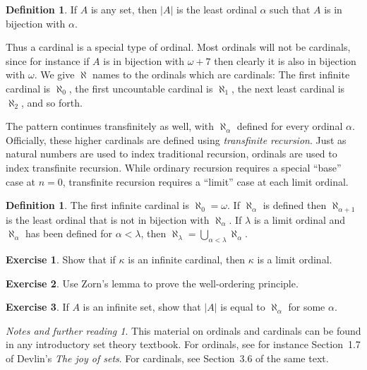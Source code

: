 \documentclass[11pt,oneside]{amsbook}
\theoremstyle{definition}
\newtheorem{exerc}{Exercise}[section]
\theoremstyle{plain}
\theoremstyle{definition}
\newtheorem{defn}[thm]{Definition}
\theoremstyle{remark}
\newtheorem*{notes}{Notes and further reading}
\begin{document}
\begin{defn}
  If $A$ is any set, then $|A|$ is the least ordinal $\alpha$ such that $A$ is in bijection with $\alpha$.
\end{defn}

Thus a cardinal is a special type of ordinal. Most ordinals will not be cardinals, since for instance if $A$ is in bijection with $\omega+7$ then clearly it is also in bijection with $\omega$. We give $\aleph$ names to the ordinals which are cardinals: The first infinite cardinal is $\aleph_0$, the first uncountable cardinal is $\aleph_1$, the next least cardinal is $\aleph_2$, and so forth.

The pattern continues transfinitely as well, with $\aleph_\alpha$ defined for every ordinal $\alpha$. Officially, these higher cardinals are defined using \emph{transfinite recursion}. Just as natural numbers are used to index traditional recursion, ordinals are used to index transfinite recursion. While ordinary recursion requires a special ``base'' case at $n=0$, transfinite recursion requires a ``limit'' case at each limit ordinal.

\begin{defn}
  The first infinite cardinal is $\aleph_0=\omega$. If $\aleph_\alpha$ is defined then $\aleph_{\alpha+1}$ is the least ordinal that is not in bijection with $\aleph_\alpha$. If $\lambda$ is a limit ordinal and $\aleph_\alpha$ has been defined for $\alpha<\lambda$, then $\aleph_\lambda=\bigcup_{\alpha<\lambda}\aleph_\alpha$.
\end{defn}


\begin{exerc}
  Show that if $\kappa$ is an infinite cardinal, then $\kappa$ is a limit ordinal.
\end{exerc}

\begin{exerc}
  Use Zorn's lemma to prove the well-ordering principle.
\end{exerc}

\begin{exerc}
  If $A$ is an infinite set, show that $|A|$ is equal to $\aleph_\alpha$ for some $\alpha$.
\end{exerc}

\begin{notes}
  This material on ordinals and cardinals can be found in any introductory set theory textbook. For ordinals, see for instance Section~1.7 of Devlin's \emph{The joy of sets}. For cardinals, see Section~3.6 of the same text.
\end{notes}
\end{document}
